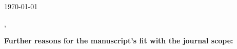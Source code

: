 \documentclass{jourcl}
\begin{document}
\large %

\noindent\makebox[\linewidth]{\rule{0.9\paperwidth}{0.4pt}}

\today
\vspace{-.7cm}

\vspace*{1\baselineskip}
\pPersonAddressing,

\pIntroduction
\begin{framed}
\setlength{\parskip}{0pt}
\setlength{\parsep}{0pt}
\noindent\textbf{Further reasons for the manuscript’s fit with the journal scope:}
\vspace{-0.5em}
\pabstract
\end{framed}


\vspace{-.7cm}

\pfinal

\pdeclaration\newline


\pvalediction\par
\vspace{-.7cm}
\psignature
\end{document}
